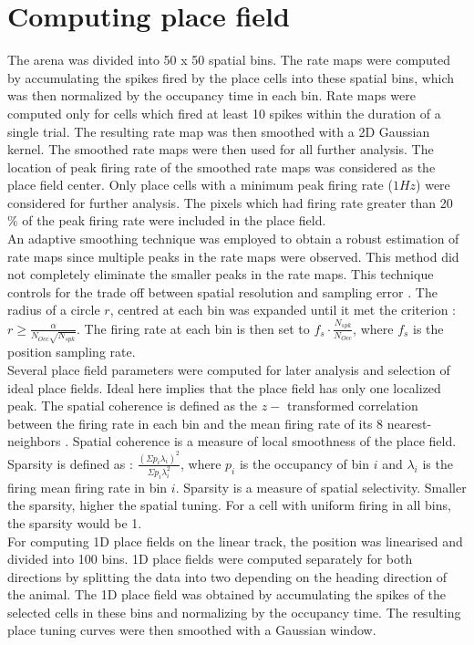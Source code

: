 \section{Computing place field}
\label{pfcompute}
The arena was divided into 50 x 50 spatial bins. The rate maps were computed by accumulating the spikes fired by the place cells into these spatial bins, which was then normalized by the occupancy time in each bin.
Rate maps were computed only for cells which fired at least 10 spikes within the duration of a single trial. The resulting rate map was then smoothed with a 2D Gaussian kernel. The smoothed rate maps were then used for all further analysis. The location of peak firing rate of the smoothed rate maps was considered as the place field center. Only place cells with a minimum peak firing rate ($1Hz$) were considered for further analysis. The pixels which had firing rate greater than 20 $\%$ of the peak firing rate were included in the place field.\\ 
An adaptive smoothing technique was employed to obtain a robust estimation of rate maps since multiple peaks in the rate maps were observed. This method did not completely eliminate the smaller peaks in the rate maps. This technique controls for the trade off between spatial resolution and sampling error \cite{Skaggs1996c}. The radius of a circle $r$, centred at each bin was expanded until it met the criterion :   $ r \geq \frac{\alpha}{N_{Occ} \sqrt{N_{spk}}}$. The firing rate at each bin is then set to $f_{s} \cdot \frac{N_{spk}}{N_{Occ}}$, where $f_{s}$ is the position sampling rate.\\
Several place field parameters were computed for later analysis and selection of ideal place fields. Ideal here implies that the place field has only one localized peak. The spatial coherence is defined as the $z-$ transformed correlation between the firing rate in each bin and the mean firing rate of its 8 nearest-neighbors \cite{Muller1989}. Spatial coherence is a measure of local smoothness of the place field.\\
Sparsity is defined as : $\frac{(\Sigma p_{i} \lambda_{i})^{2}}{\Sigma p_{i} \lambda^{2}_{i}}$, where $p_{i}$ is the occupancy of bin $i$ and $\lambda_{i}$ is the firing mean firing rate in bin $i$. Sparsity is a measure of spatial selectivity. Smaller the sparsity, higher the spatial tuning. For a cell with uniform firing in all bins, the sparsity would be 1. \\

For computing 1D place fields on the linear track, the position was linearised and divided into 100 bins.
1D place fields were computed separately for both directions by splitting the data into two depending on the heading direction of the animal. The 1D place field was obtained by accumulating the spikes of the selected cells in these bins and normalizing by the occupancy  time. The resulting place tuning curves were then smoothed with a Gaussian window.\\

